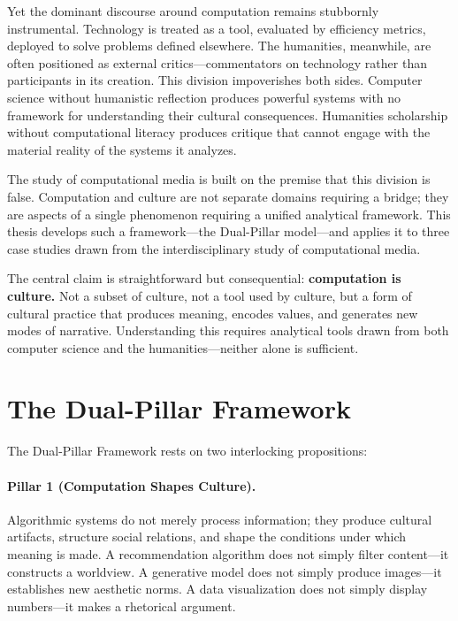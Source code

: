 \documentclass[11pt,a4paper]{article}
\begin{document}
Yet the dominant discourse around computation remains stubbornly instrumental. Technology is treated as a tool, evaluated by efficiency metrics, deployed to solve problems defined elsewhere. The humanities, meanwhile, are often positioned as external critics---commentators on technology rather than participants in its creation. This division impoverishes both sides. Computer science without humanistic reflection produces powerful systems with no framework for understanding their cultural consequences. Humanities scholarship without computational literacy produces critique that cannot engage with the material reality of the systems it analyzes.

The study of computational media is built on the premise that this division is false. Computation and culture are not separate domains requiring a bridge; they are aspects of a single phenomenon requiring a unified analytical framework. This thesis develops such a framework---the Dual-Pillar model---and applies it to three case studies drawn from the interdisciplinary study of computational media.

The central claim is straightforward but consequential: \textbf{computation is culture.} Not a subset of culture, not a tool used by culture, but a form of cultural practice that produces meaning, encodes values, and generates new modes of narrative. Understanding this requires analytical tools drawn from both computer science and the humanities---neither alone is sufficient.

\section{The Dual-Pillar Framework}

The Dual-Pillar Framework rests on two interlocking propositions:

\paragraph{Pillar 1 (Computation Shapes Culture).}
Algorithmic systems do not merely process information; they produce cultural artifacts, structure social relations, and shape the conditions under which meaning is made. A recommendation algorithm does not simply filter content---it constructs a worldview. A generative model does not simply produce images---it establishes new aesthetic norms. A data visualization does not simply display numbers---it makes a rhetorical argument.
\end{document}

